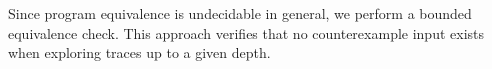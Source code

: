 

Since program equivalence is undecidable in general, we perform a bounded equivalence check. 
This approach verifies that no counterexample input exists when exploring traces up to a given depth.




